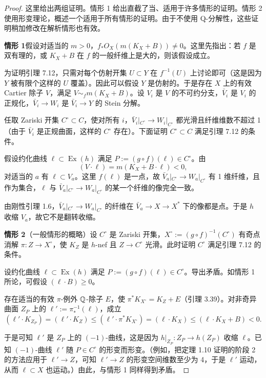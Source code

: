 \begin{proof}
这里给出两组证明。情形 1 给出直截了当、适用于许多情形的证明。情形 2 使用形变理论，概述一个适用于所有情形的证明。由于不使用 Q-分解性，这些证明稍加修改在解析情形也有效。

\textbf{情形 1}\quad 假设对适当的 $m>0$，$f_*O_X(m(K_X+B))\ne0$。这里先指出：若 $f$ 是双有理的，或 $K_X+B$ 在 $f$ 的一般纤维上是大的，则该假设成立。

为证明引理 7.12，只需对每个仿射开集 $U\subset Y$ 在 $f^{-1}(U)$ 上讨论即可（这是因为 $Y$ 被有限个这样的 $U$ 覆盖）。因此可以假设 $Y$ 是仿射的。于是存在 $X$ 上的有效 Cartier 除子 $V$，满足 $V\sim_f m(K_X+B)$。设 $V_i$ 是 $V$ 的不可约分支，$\bar V_i$ 是 $V_i$ 的正规化，$\bar V_i\to W_i$ 是 $\bar V_i\to Y$ 的 Stein 分解。

任取 Zariski 开集 $C^\circ\subset C$，使对所有 $i$，$\bar V_i|_{C^\circ}\to W_i|_{C^\circ}$ 都光滑且纤维维数不超过 1（由于 $\bar V_i$ 是正规曲面，这样的 $C^\circ$ 存在）。下面证明 $C^\circ\subset C$ 满足引理 7.12 的条件。

假设约化曲线 $\ell\subset\operatorname{Ex}(h)$ 满足 $P:=(g\circ f)(\ell)\in C^\circ$。由
\[
(V\cdot\ell)=m(K_X+B\cdot\ell)<0,
\]
对适当的 $a$ 有 $\ell\subset V_a$。这里 $f(\ell)$ 是一点，故 $\bar V_a|_{C^\circ}\to W_a|_{C^\circ}$ 有 1 维纤维，且作为集合，$\ell$ 与 $\bar V_a|_{C^\circ}\to W_a|_{C^\circ}$ 的某一个纤维的像完全一致。

由刚性引理 1.6，$\bar V_a|_{C^\circ}\to W_a|_{C^\circ}$ 的纤维在 $\bar V_a\to X\to X^*$ 下的像都是点。于是 $h$ 收缩 $V_a$，故它不是翻转收缩。


\textbf{情形 2}（一般情形的概略）\quad 设 $C^\circ$ 是 Zariski 开集，$X^\circ:=(g\circ f)^{-1}(C^\circ)$ 有奇点消解 $\pi\colon Z\to X^\circ$，使 $K_Z$ 是 $h$-nef 且 $Z\to C^\circ$ 光滑。此时证明 $C^\circ$ 满足引理 7.12 的条件。

设约化曲线 $\ell\subset\operatorname{Ex}(h)$ 满足 $P:=(g\circ f)(\ell)\in C^\circ$。导出矛盾。如情形 1 所论，可假设 $(\ell\cdot B)\ge0$。

存在适当的有效 $\pi$-例外 $\mathbb{Q}$-除子 $E$，使 $\pi^*K_{X^\circ}=K_Z+E$（引理 3.39）。对非奇异曲面 $Z_P$ 上的 $\ell':=\pi^{-1}_*(\ell)$，成立
\[
(\ell'\cdot K_{Z_P})=(\ell'\cdot K_Z)\le(\ell'\cdot\pi^*K_{X^\circ})=(\ell\cdot K_X)\le(\ell\cdot K_X+B)<0.
\]

于是可知 $\ell'$ 是 $Z_P$ 上的 $(-1)$-曲线，这是因为 $h|_{Z_P}\colon Z_P\to h(Z_P)$ 收缩 $\ell$。已知 $(-1)$-曲线 $\ell'$ 随 $P\in C^\circ$ 的形变而形变。（例如，把定理 1.10 证明的阶段 2 的方法应用于 $\ell'\to Z$，可知 $\ell'\to Z$ 的形变空间维数至少为 4，于是 $\ell'$ 运动，从而 $\ell\subset X$ 也运动。）由此，与情形 1 同样得到矛盾。
\end{proof}

